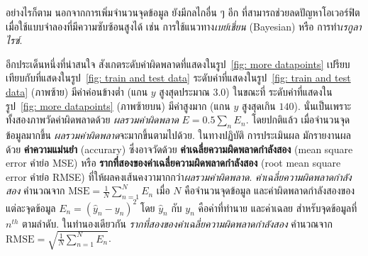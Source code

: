 อย่างไรก็ตาม
นอกจากการเพิ่มจำนวนจุดข้อมูล
ยังมีกลไกอื่น ๆ อีก
ที่สามารถช่วยลดปัญหาโอเวอร์ฟิต
เมื่อใช้แบบจำลองที่มีความซับซ้อนสูงได้
เช่น 
การใช้แนวทาง\textit{เบย์เชี่ยน} (Bayesian)
หรือ
การทำ\textit{เรกูลาไรซ์}.

อีกประเด็นหนึ่งที่น่าสนใจ
สังเกตระดับค่าผิดพลาดที่แสดงในรูป~\ref{fig: more datapoints} เปรียบเทียบกับที่แสดงในรูป~\ref{fig: train and test data}
ระดับค่าที่แสดงในรูป~\ref{fig: train and test data} (ภาพซ้าย) มีค่าค่อนข้างต่ำ (แกน $y$ สูงสุดประมาณ $3.0$)
ในขณะที่
ระดับค่าที่แสดงในรูป~\ref{fig: more datapoints} (ภาพซ้ายบน)
มีค่าสูงมาก (แกน $y$ สูงสุดเกิน $140$).
นั่นเป็นเพราะ
ทั้งสองภาพวัดค่าผิดพลาดด้วย \textit{ผลรวมค่าผิดพลาด} $E = 0.5 \sum_n E_n$.
โดยปกติแล้ว
เมื่อจำนวนจุดข้อมูลมากขึ้น \textit{ผลรวมค่าผิดพลาด}จะมากขึ้นตามไปด้วย.
ในทางปฏิบัติ การประเมินผล มักรายงานผลด้วย
\textbf{ค่าความแม่นยำ} (accurary)
ซึ่งอาจวัดด้วย
\textbf{ค่าเฉลี่ยความผิดพลาดกำลังสอง} (mean square error คำย่อ MSE) 
หรือ
\textbf{รากที่สองของค่าเฉลี่ยความผิดพลาดกำลังสอง} (root mean square error คำย่อ RMSE)
ที่ให้ผลคงเส้นคงวามากกว่า\textit{ผลรวมค่าผิดพลาด}.
\textit{ค่าเฉลี่ยความผิดพลาดกำลังสอง} คำนวณจาก
$\mathrm{MSE} = \frac{1}{N} \sum_{n=1}^N E_n$
เมื่อ $N$ คือจำนวนจุดข้อมูล
และค่าผิดพลาดกำลังสองของแต่ละจุดข้อมูล $E_n = (\hat{y}_n - y_n)^2$ โดย 
$\hat{y}_n$ กับ $y_n$ คือค่าที่ทำนาย และค่าเฉลย สำหรับจุดข้อมูลที่ $n^{th}$ ตามลำดับ.
ในทำนองเดียวกัน
\textit{รากที่สองของค่าเฉลี่ยความผิดพลาดกำลังสอง} คำนวณจาก
$\mathrm{RMSE} = \sqrt{\frac{1}{N} \sum_{n=1}^N E_n}$.

